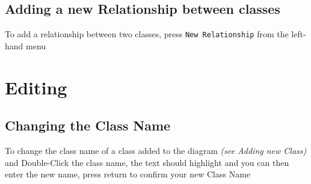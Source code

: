 \documentclass[a4paper]{article}
\begin{document}
\newpage

\subsection{Adding a new Relationship between classes}
To add a relationship between two classes, press \texttt{New Relationship} from the left-hand menu

\section{Editing}
\subsection{Changing the Class Name}
To change the class name of a class added to the diagram \emph{(see Adding new Class)} and Double-Click the class name, the text should highlight and you can then enter the new name, press return to confirm your new Class Name
\end{document}

